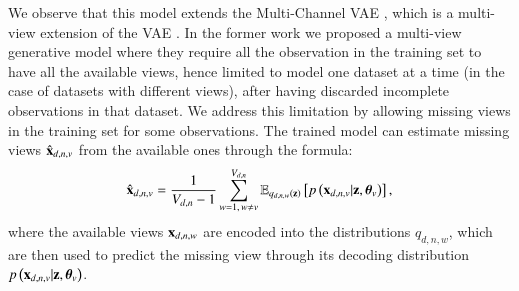 We observe that this model extends the Multi-Channel VAE \citep{Antelmi2019}, which is a multi-view extension of the VAE \citep{Kingma2013,Rezende2014}.
In the former work we proposed a multi-view generative model where they require all the observation in the training set to have all the available views, hence limited to model one dataset at a time (in the case of datasets with different views), after having discarded incomplete observations in that dataset.
We address this limitation by allowing missing views in the training set for some observations.
The trained model can estimate missing views $\hat{\mathbf{x}}_{d,n,v}$ from the available ones through the formula:
\begin{equation}\label{eq:reconstruction}
\begin{aligned}
\hat{\mathbf{x}}_{d,n,v} = \frac{1}{V_{d, n}-1} \sum_{w=1, \,w\neq v}^{V_{d, n}} \operatorname{\mathbb{E}}_{q_{d,n,w}(\mathbf{z})}\left[p\left(\mathbf{x}_{d,n,v}|\mathbf{z}, \boldsymbol{\theta}_v\right)\right],
\end{aligned}
\end{equation}
where the available views $\mathbf{x}_{d,n,w}$ are encoded into the distributions $q_{d,n,w}$, which are then used to predict the missing view through its decoding distribution $p\left(\mathbf{x}_{d,n,v}|\mathbf{z}, \boldsymbol{\theta}_v\right)$.

